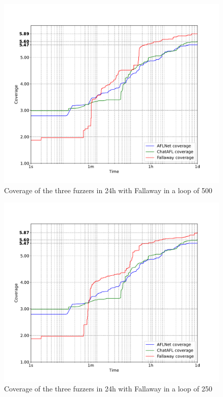 \begin{figure}[H]
    \centering
    \includegraphics[width=1\textwidth]{Images/coverage_over_time_lighttpd-1day-500l.pdf}
    \caption{Coverage of the three fuzzers in 24h with Fallaway in a loop of 500}
    \label{fig:coverage_1day_500l}
\end{figure}

\begin{figure}[H]
    \centering
    \includegraphics[width=1\textwidth]{Images/coverage_over_time_lighttpd-1day-250l.pdf}
    \caption{Coverage of the three fuzzers in 24h with Fallaway in a loop of 250}
    \label{fig:coverage_1day_250l}
\end{figure}

